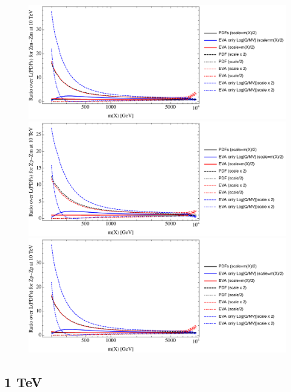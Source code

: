 \documentclass[a4paper,11pt]{article}
\begin{document}
\begin{figure}[ht]
\includegraphics[width=0.46\linewidth]{PlotLumi/10TeV/ratios/Zm-Zm.pdf}
\includegraphics[width=0.46\linewidth]{PlotLumi/10TeV/ratios/Zp-Zm.pdf}
\includegraphics[width=0.46\linewidth]{PlotLumi/10TeV/ratios/Zp-Zp.pdf}
\end{figure}

%
%
%
\clearpage
\subsection{1 TeV}
\end{document}
